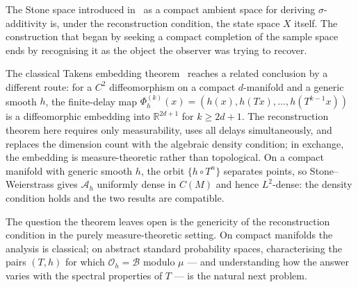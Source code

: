 \noindent The Stone space introduced in~\cite{mahon_paper1} as a compact
ambient space for deriving $\sigma$-additivity is, under the reconstruction
condition, the state space $X$ itself.  The construction that began by seeking
a compact completion of the sample space ends by recognising it as the object
the observer was trying to recover.

The classical Takens embedding theorem~\cite{Takens1981} reaches a related
conclusion by a different route: for a $C^2$ diffeomorphism on a compact
$d$-manifold and a generic smooth $h$, the finite-delay map
$\Phi_h^{(k)}(x) = (h(x), h(Tx), \ldots, h(T^{k-1}x))$ is a diffeomorphic
embedding into $\mathbb{R}^{2d+1}$ for $k \geq 2d+1$.  The reconstruction
theorem here requires only measurability, uses all delays simultaneously, and
replaces the dimension count with the algebraic density condition; in exchange,
the embedding is measure-theoretic rather than topological.  On a compact
manifold with generic smooth $h$, the orbit $\{h \circ T^n\}$ separates
points, so Stone--Weierstrass gives $\mathcal{A}_h$ uniformly dense in $C(M)$
and hence $L^2$-dense: the density condition holds and the two results are
compatible.

The question the theorem leaves open is the genericity of the reconstruction
condition in the purely measure-theoretic setting.  On compact manifolds the
analysis is classical; on abstract standard probability spaces, characterising
the pairs $(T, h)$ for which $\mathcal{O}_h = \mathcal{B}$ modulo $\mu$ — and
understanding how the answer varies with the spectral properties of $T$ — is
the natural next problem.



